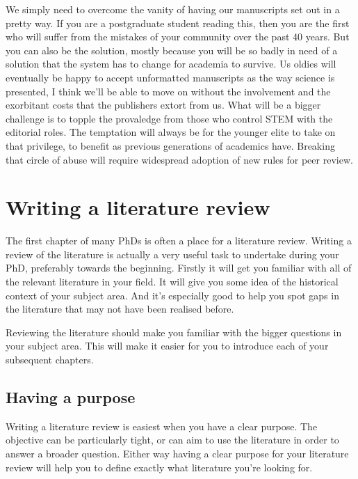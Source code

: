 \documentclass[
]{krantz}
\begin{document}
We simply need to overcome the vanity of having our manuscripts set out in a pretty way. If you are a postgraduate student reading this, then you are the first who will suffer from the mistakes of your community over the past 40 years. But you can also be the solution, mostly because you will be so badly in need of a solution that the system has to change for academia to survive. Us oldies will eventually be happy to accept unformatted manuscripts as the way science is presented, I think we'll be able to move on without the involvement and the exorbitant costs that the publishers extort from us. What will be a bigger challenge is to topple the provaledge from those who control STEM with the editorial roles. The temptation will always be for the younger elite to take on that privilege, to benefit as previous generations of academics have. Breaking that circle of abuse will require widespread adoption of new rules for peer review.

\hypertarget{review}{%
\chapter{Writing a literature review}\label{review}}

The first chapter of many PhDs is often a place for a literature review. Writing a review of the literature is actually a very useful task to undertake during your PhD, preferably towards the beginning. Firstly it will get you familiar with all of the relevant literature in your field. It will give you some idea of the historical context of your subject area. And it's especially good to help you spot gaps in the literature that may not have been realised before.

Reviewing the literature should make you familiar with the bigger questions in your subject area. This will make it easier for you to introduce each of your subsequent chapters.

\hypertarget{having-a-purpose}{%
\section{Having a purpose}\label{having-a-purpose}}

Writing a literature review is easiest when you have a clear purpose. The objective can be particularly tight, or can aim to use the literature in order to answer a broader question. Either way having a clear purpose for your literature review will help you to define exactly what literature you're looking for.
\end{document}
